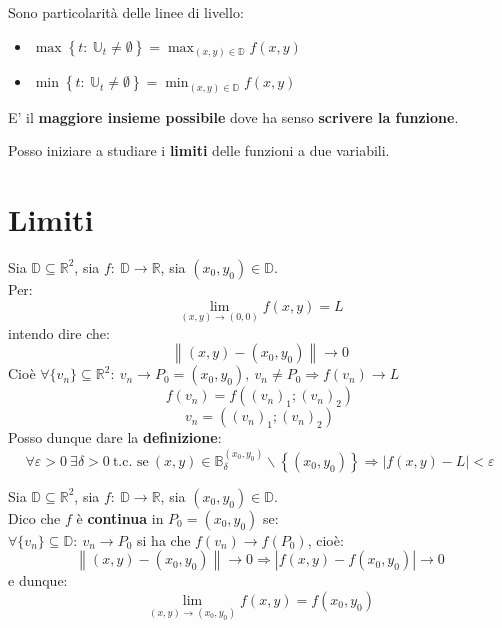 \documentclass[a4paper, oneside]{article}
\newcommand\U{\mathbb{U}}
\newcommand\R{\mathbb{R}}
\newcommand\B{\mathbb{B}}
\newcommand\D{\mathbb{D}}
\begin{document}
    \begin{observation}
    Sono particolarità delle linee di livello:
        \begin{itemize}
            \item $\displaystyle \max\left\{t: \ \U_t\neq \emptyset\right\} = \max_{(x,y)\in\D} f(x,y)$
            \item $\displaystyle \min\left\{t: \ \U_t\neq \emptyset \right\} = \min_{(x,y)\in\D} f(x,y)$
        \end{itemize}
    \end{observation}

    \begin{definition}
        E' il \textbf{maggiore insieme possibile} dove ha senso \textbf{scrivere la funzione}.
    \end{definition}

    \noindent Posso iniziare a studiare i \textbf{limiti} delle funzioni a due variabili.

    \newpage

    \section{Limiti}

    Sia $\D \subseteq \R^2$, sia $f: \ \D\to\R$, sia $(x_0,y_0)\in\D$.\\
    Per:
    \[\lim_{(x,y)\to(0,0)} f(x,y) = L\]
    intendo dire che:
    \[\left\lVert (x,y) - (x_0,y_0)\right\rVert \to 0\]
    Cioè $\forall\{v_n\}\subseteq\R^2: \ v_n\to P_0 = (x_0,y_0), \ v_n\ne P_0 \Longrightarrow f(v_n)\to L$\\
    \[f(v_n) = f\left((v_n)_1;(v_n)_2\right)\]
    \[v_n = \left((v_n)_1;(v_n)_2\right)\]
    Posso dunque dare la \textbf{definizione}:
    \[\forall\varepsilon > 0 \ \exists\delta >0 \ \text{t.c. se} \ (x,y)\in\B_\delta^{(x_0,y_0)}\backslash \left\{(x_0,y_0)\right\} \Longrightarrow \left|f(x,y) - L\right| < \varepsilon\]

    \begin{definition}
        Sia $\D \subseteq \R^2$, sia $f: \ \D\to\R$, sia $(x_0,y_0)\in\D$.\\
        Dico che $f$ è \textbf{continua} in $P_0 = (x_0,y_0)$ se:\\
        $\forall\{v_n\}\subseteq\D: \ v_n\to P_0$ si ha che $f(v_n)\to f(P_0)$, cioè:
        \[\left\lVert (x,y) - (x_0,y_0)\right\rVert\to 0 \Longrightarrow \left|f(x,y) - f(x_0,y_0)\right|\to 0\]
        e dunque:
        \[\lim_{(x,y)\to(x_0,y_0)} f(x,y) = f(x_0,y_0)\]
    \end{definition}
\end{document}

